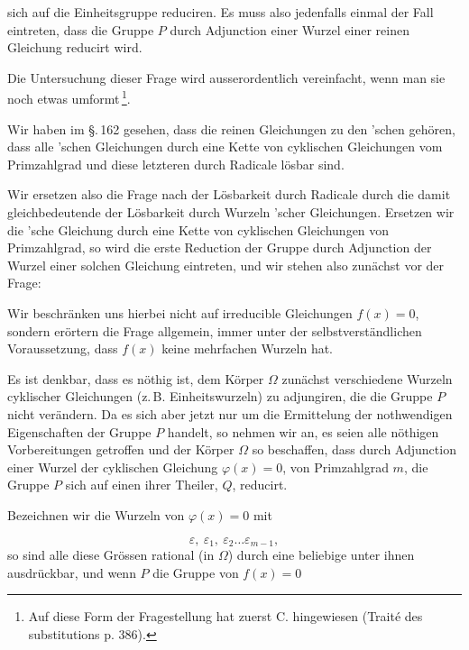
sich auf die Einheitsgruppe reduciren. Es muss also jedenfalls
einmal der Fall eintreten, dass die Gruppe $P$ durch Adjunction
einer Wurzel einer reinen Gleichung reducirt wird.

Die Untersuchung dieser Frage wird ausserordentlich vereinfacht,
wenn man sie noch etwas umformt\,\footnote{Auf diese Form der Fragestellung hat zuerst C.  hingewiesen (Trait\'e des substitutions p. 386).}.

Wir haben im \S.\,162 gesehen, dass die reinen Gleichungen zu den
'schen gehören, dass alle 'schen Gleichungen durch eine
Kette von cyklischen Gleichungen vom Primzahlgrad und diese
letzteren durch Radicale lösbar sind.

Wir ersetzen also die Frage nach der Lösbarkeit durch Radicale
durch die damit gleichbedeutende der Lösbarkeit durch Wurzeln
'scher Gleichungen. Ersetzen wir die 'sche Gleichung durch
eine Kette von cyklischen Gleichungen von Primzahlgrad, so wird
die erste Reduction der Gruppe durch Adjunction der Wurzel einer
solchen Gleichung eintreten, und wir stehen also zunächst vor der
Frage:


Wir beschränken uns hierbei nicht auf irreducible Gleichungen
$f(x) = 0$, sondern erörtern die Frage allgemein, immer unter der
selbstverständlichen Voraussetzung, dass $f(x)$ keine mehrfachen
Wurzeln hat.

Es ist denkbar, dass es nöthig ist, dem Körper $\Omega$ zunächst
verschiedene Wurzeln cyklischer Gleichungen (z.\,B. Einheitswurzeln)
zu adjungiren, die die Gruppe $P$ nicht verändern. Da es sich aber
jetzt nur um die Ermittelung der nothwendigen Eigenschaften der
Gruppe $P$ handelt, so nehmen wir an, es seien alle nöthigen
Vorbereitungen getroffen und der Körper $\Omega$ so beschaffen,
dass durch Adjunction einer Wurzel der cyklischen Gleichung
$\varphi(x) = 0$, von Primzahlgrad $m$, die Gruppe $P$ sich auf
einen ihrer Theiler, $Q$, reducirt.

Bezeichnen wir die Wurzeln von $\varphi(x) = 0$ mit

\[
\varepsilon,\ \varepsilon_1,\ \varepsilon_2 \ldots \varepsilon_{m-1},
\]
so sind alle diese Grössen rational (in $\Omega$) durch eine
beliebige unter ihnen ausdrückbar, und wenn $P$ die Gruppe von
$f(x) = 0$
